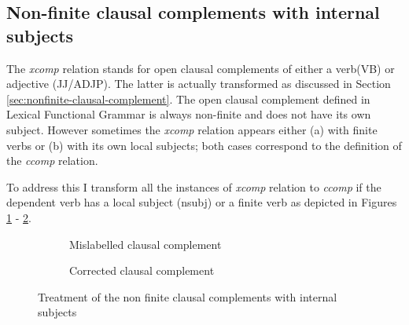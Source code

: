 \subsection{Non-finite clausal complements with internal subjects}
    The \textit{xcomp} relation stands for open clausal complements of either a verb(VB) or adjective (JJ/ADJP). The latter is actually transformed as discussed in Section \ref{sec:nonfinite-clausal-complement}. The open clausal complement defined in Lexical Functional Grammar \cite[p270--275]{Bresnan2001} is always non-finite and does not have its own subject. However sometimes the \textit{xcomp} relation appears either (a) with finite verbs or (b) with its own local subjects; both cases correspond to the definition of the \textit{ccomp} relation. 

    To address this I transform all the instances of \textit{xcomp} relation to \textit{ccomp} if the dependent verb has a local subject (nsubj) or a finite verb as depicted in Figures \ref{fig:xcomp-init} - \ref{fig:xcomp-final}.

    \begin{figure}[!ht]
        \centering
        \begin{subfigure}[t]{0.45\linewidth}
        \centering
        \caption{Mislabelled clausal complement}
        \label{fig:xcomp-init}
        \end{subfigure}
        \quad
        \begin{subfigure}[t]{0.45\linewidth}
        \centering
        	\caption{Corrected clausal complement}
        	\label{fig:xcomp-final}
        \end{subfigure}
        \caption{Treatment of the non finite clausal complements with internal subjects}
        \label{fig:xcomp-final-final}
    \end{figure}
    
